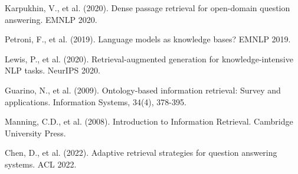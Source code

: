 \documentclass[11pt]{article}
\begin{document}
\begin{thebibliography}{10}

Karpukhin, V., et al. (2020). Dense passage retrieval for open-domain question answering. EMNLP 2020.

Petroni, F., et al. (2019). Language models as knowledge bases? EMNLP 2019.

Lewis, P., et al. (2020). Retrieval-augmented generation for knowledge-intensive NLP tasks. NeurIPS 2020.

Guarino, N., et al. (2009). Ontology-based information retrieval: Survey and applications. Information Systems, 34(4), 378-395.

Manning, C.D., et al. (2008). Introduction to Information Retrieval. Cambridge University Press.

Chen, D., et al. (2022). Adaptive retrieval strategies for question answering systems. ACL 2022.

\end{thebibliography}
\end{document}
